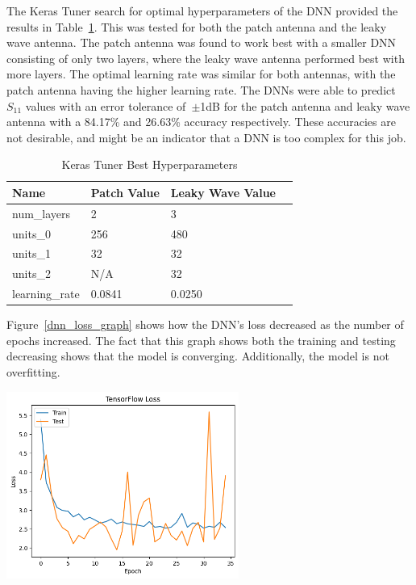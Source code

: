 \documentclass[lettersize,journal]{IEEEtran}
\newenvironment{Figure}
    {\par\medskip\noindent\minipage{\linewidth}}
    {\endminipage\par\medskip}
\begin{document}
The Keras Tuner search for optimal hyperparameters of the DNN provided the results in Table~\ref{keras_best_params}. This was tested for both the patch antenna and the leaky wave antenna. The patch antenna was found to work best with a smaller DNN consisting of only two layers, where the leaky wave antenna performed best with more layers. The optimal learning rate was similar for both antennas, with the patch antenna having the higher learning rate. The DNNs were able to predict $S_{11}$ values with an error tolerance of~$\pm$1dB for the patch antenna and leaky wave antenna with a 84.17\% and 26.63\% accuracy respectively. These accuracies are not desirable, and might be an indicator that a DNN is too complex for this job.

\begin{table}[h]
\caption{Keras Tuner Best Hyperparameters}
\begin{center}
\begin{tabular}{ |l|l|l|l| }
    \hline
    Name & Patch Value & Leaky Wave Value \\ 
    \hline
    num\_layers & 2 & 3 \\  
    \hline
    units\_0 & 256 & 480 \\
    \hline
    units\_1 & 32 & 32 \\
    \hline
    units\_2 & N/A & 32 \\
    \hline
    learning\_rate & 0.0841 & 0.0250 \\
    \hline
\end{tabular}
\end{center}
\label{keras_best_params}
\end{table}

Figure~\ref{dnn_loss_graph} shows how the DNN's loss decreased as the number of epochs increased. The fact that this graph shows both the training and testing decreasing shows that the model is converging. Additionally, the model is not overfitting. 

\begin{Figure}
    \centering
    \includegraphics[width=3in]{loss}
    \label{dnn_loss_graph}
\end{Figure}
\end{document}
